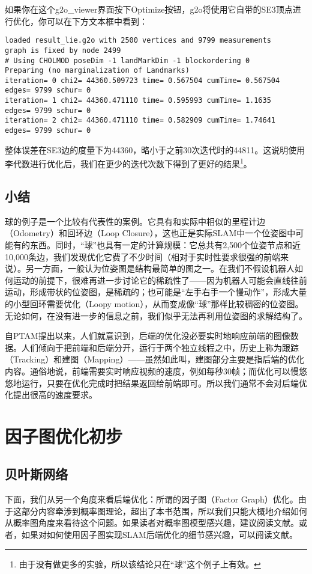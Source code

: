 如果你在这个g2o\_viewer界面按下Optimize按钮，g2o将使用它自带的SE3顶点进行优化，你可以在下方文本框中看到：

\begin{lstlisting}
loaded result_lie.g2o with 2500 vertices and 9799 measurements
graph is fixed by node 2499
# Using CHOLMOD poseDim -1 landMarkDim -1 blockordering 0
Preparing (no marginalization of Landmarks)
iteration= 0 chi2= 44360.509723 time= 0.567504 cumTime= 0.567504 edges= 9799 schur= 0
iteration= 1 chi2= 44360.471110 time= 0.595993 cumTime= 1.1635   edges= 9799 schur= 0
iteration= 2 chi2= 44360.471110 time= 0.582909 cumTime= 1.74641  edges= 9799 schur= 0
\end{lstlisting}

整体误差在SE3边的度量下为44360，略小于之前30次迭代时的44811。这说明使用李代数进行优化后，我们在更少的迭代次数下得到了更好的结果\footnote{由于没有做更多的实验，所以该结论只在“球”这个例子上有效。}。

\subsection{小结}
球的例子是一个比较有代表性的案例。它具有和实际中相似的里程计边（Odometry）和回环边（Loop Closure），这也正是实际SLAM中一个位姿图中可能有的东西。同时，“球”也具有一定的计算规模：它总共有2,500个位姿节点和近10,000条边，我们发现优化它费了不少时间（相对于实时性要求很强的前端来说）。另一方面，一般认为位姿图是结构最简单的图之一。在我们不假设机器人如何运动的前提下，很难再进一步讨论它的稀疏性了——因为机器人可能会直线往前运动，形成带状的位姿图，是稀疏的；也可能是“左手右手一个慢动作”，形成大量的小型回环需要优化（Loopy motion），从而变成像“球”那样比较稠密的位姿图。无论如何，在没有进一步的信息之前，我们似乎无法再利用位姿图的求解结构了。

自PTAM\textsuperscript{\cite{Klein2007}}提出以来，人们就意识到，后端的优化没必要实时地响应前端的图像数据。人们倾向于把前端和后端分开，运行于两个独立线程之中，历史上称为跟踪（Tracking）和建图（Mapping）——虽然如此叫，建图部分主要是指后端的优化内容。通俗地说，前端需要实时响应视频的速度，例如每秒30帧；而优化可以慢悠悠地运行，只要在优化完成时把结果返回给前端即可。所以我们通常不会对后端优化提出很高的速度要求。

\section{\textsuperscript{\ttfamily *}因子图优化初步}
\subsection{贝叶斯网络}
下面，我们从另一个角度来看后端优化：所谓的因子图（Factor Graph）优化。由于这部分内容牵涉到概率图理论，超出了本书范围，所以我们只能大概地介绍如何从概率图角度来看待这个问题。如果读者对概率图模型感兴趣，建议阅读文献\cite{Koller2009}。或者，如果对如何使用因子图实现SLAM后端优化的细节感兴趣，可以阅读文献\cite{Kaess2008, Kaess2011, Rosen2014, Sola2016}。

